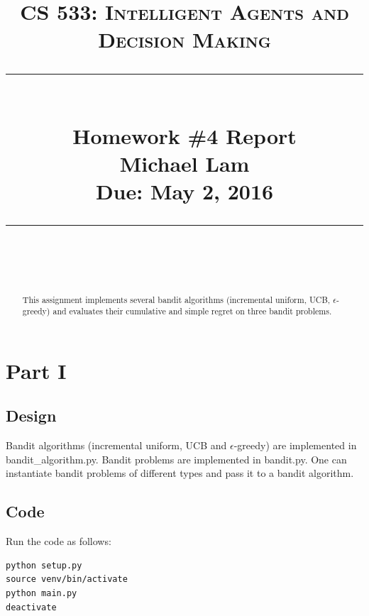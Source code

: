 \documentclass[paper=a4, fontsize=11pt]{scrartcl}
\newcommand{\lecture}{Homework \#4 Report} %
\newcommand{\lecturedate}{Due: May 2, 2016} %
\newcommand{\scribe}{Michael Lam} %
\begin{document}
\newcommand{\horrule}[1]{\rule{\linewidth}{#1}} %

\title{	
\normalfont \normalsize
\vspace{-30pt}
\textsc{CS 533: Intelligent Agents and Decision Making} \\ [10pt]
\horrule{0.5pt} \\[0.4cm] %
\LARGE \lecture\\ %
\vspace{5pt}
\normalsize \scribe\\
\lecturedate\\
\horrule{2pt} \\[0.5cm] %
}


\date{} %

\maketitle
\vspace{-100pt}

\begin{abstract}
This assignment implements several bandit algorithms (incremental uniform, UCB, $\epsilon$-greedy) and evaluates their cumulative and simple regret on three bandit problems.
\end{abstract}

\section{Part I}

\subsection{Design}

Bandit algorithms (incremental uniform, UCB and $\epsilon$-greedy) are implemented in bandit\_algorithm.py. Bandit problems are implemented in bandit.py. One can instantiate bandit problems of different types and pass it to a bandit algorithm.

\subsection{Code}

Run the code as follows:

\begin{verbatim}
python setup.py
source venv/bin/activate
python main.py
deactivate
\end{verbatim}
\end{document}

